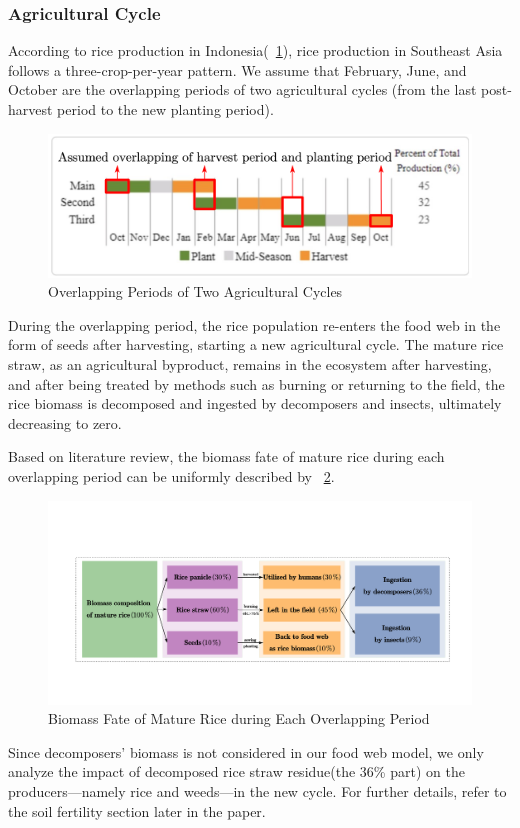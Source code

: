 \documentclass{HZNUMCM}
\begin{document}
      \subsubsection{Agricultural Cycle}
        According to rice production in Indonesia(\figurename~\ref{fig:PlantModePlus}), 
        rice production in Southeast Asia follows a three-crop-per-year pattern. 
        We assume that February, June, and October are the overlapping periods of two agricultural cycles 
        (from the last post-harvest period to the new planting period).
        \begin{figure}[H]
          \centering
          \includegraphics[width=0.7\linewidth]{images/PlantModePlus.png}
          \caption{Overlapping Periods of Two Agricultural Cycles}
          \label{fig:PlantModePlus}
        \end{figure}
        During the overlapping period, the rice population re-enters the food web in the form of seeds after harvesting, 
        starting a new agricultural cycle. The mature rice straw, as an agricultural byproduct, 
        remains in the ecosystem after harvesting, and after being treated by methods such as burning or returning to the field, 
        the rice biomass is decomposed and ingested by decomposers and insects, ultimately decreasing to zero.

        Based on literature review\cite{OLIVER20191139,summers2003biomass}, 
        the biomass fate of mature rice during each overlapping period can be uniformly described by \figurename~\ref{fig:rice_to}. 
        \begin{figure}[H]
          \centering
          \includegraphics[width=\linewidth]{images/rice_to.pdf}
          \caption{Biomass Fate of Mature Rice during Each Overlapping Period}
          \label{fig:rice_to}
        \end{figure}
        Since decomposers' biomass is not considered in our food web model, 
        we only analyze the impact of decomposed rice straw residue(the 36\% part) on the producers—namely rice and weeds—in the new cycle. 
        For further details, refer to the soil fertility section later in the paper.
      
\end{document}
